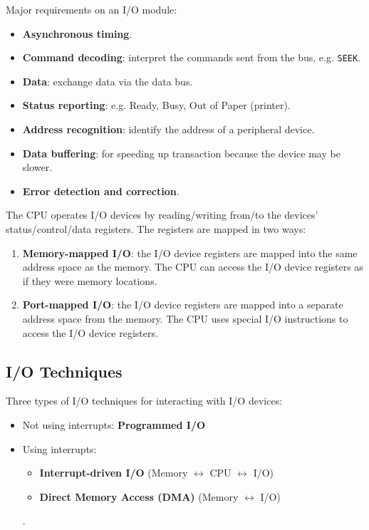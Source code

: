 \begin{multicols}{2}
Major requirements on an I/O module:
\begin{itemize}
    \item \textbf{Asynchronous timing}.
    \item \textbf{Command decoding}: interpret the commands sent from the bus, e.g. \texttt{SEEK}.
    \item \textbf{Data}: exchange data via the data bus.
    \item \textbf{Status reporting}: e.g. Ready, Busy, Out of Paper (printer).
    \item \textbf{Address recognition}: identify the address of a peripheral device.
    \item \textbf{Data buffering}: for speeding up transaction because the device may be slower.
    \item \textbf{Error detection and correction}.
\end{itemize}

\end{multicols}

The CPU operates I/O devices by reading/writing from/to the devices' status/control/data
registers. The registers are mapped in two ways:
\begin{enumerate}
    \item \textbf{Memory-mapped I/O}: the I/O device registers are mapped into the same
        address space as the memory. The CPU can access the I/O device registers as if
        they were memory locations.
    \item \textbf{Port-mapped I/O}: the I/O device registers are mapped into a separate
        address space from the memory. The CPU uses special I/O instructions to access
        the I/O device registers. \label{lbl:port-mapped-io}
\end{enumerate}

\subsection{I/O Techniques}

Three types of I/O techniques for interacting with I/O devices:
\begin{itemize}
    \item Not using interrupts: \textbf{Programmed I/O}
    \item Using interrupts: \begin{itemize}
        \item \textbf{Interrupt-driven I/O} (Memory $\leftrightarrow$ CPU $\leftrightarrow$ I/O)
        \item \textbf{Direct Memory Access (DMA)} (Memory $\leftrightarrow$ I/O)
    \end{itemize}.
\end{itemize}

